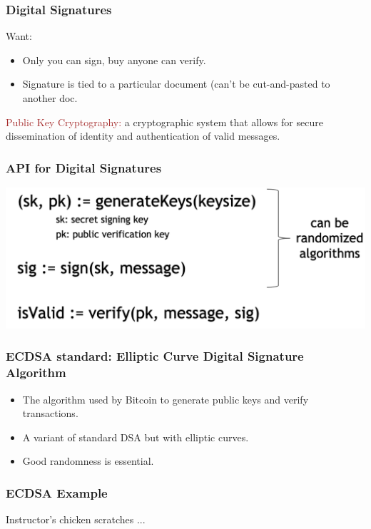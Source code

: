 \documentclass{beamer}
\begin{document}
\begin{frame}
  \frametitle{Digital Signatures}
	Want:
	\begin{itemize}
		\item Only you can sign, buy anyone can verify.
		\item Signature is tied to a particular document (can't be cut-and-pasted to another doc.

	\end{itemize}
	\pause
	\begin{block}{\textcolor{brown}{Public Key Cryptography:}}  a cryptographic system that allows for secure dissemination of identity and authentication of valid messages.
	\end{block}
\end{frame}
\begin{frame}
  \frametitle{API for Digital Signatures}

	\includegraphics[scale=0.5]{api}
\end{frame}
\begin{frame}
  \frametitle{ECDSA standard: Elliptic Curve Digital Signature Algorithm}

	\begin{itemize}
		\item The algorithm used by Bitcoin  to generate public keys and verify transactions.
		\item A variant of standard DSA but with elliptic curves.
		\item Good randomness is essential.
	\end{itemize}
\end{frame}
\begin{frame}
  \frametitle{ECDSA Example}

	Instructor's chicken scratches ... 
\end{frame}
\end{document}
